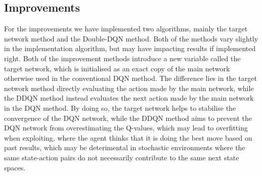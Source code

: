 \subsection{Improvements}
For the improvements we have implemented two algorithms, mainly the target network method and the Double-DQN method. Both of the methods vary slightly in the implementation algorithm, but may have impacting results if implemented right. Both of the improvement methods introduce a new variable called the target network, which is initialised as an exact copy of the main network otherwise used in the conventional DQN method. The difference lies in the target network method directly evaluating the action made by the main network, while the DDQN method instead evaluates the next action made by the main network in the DQN method. By doing so, the target network helps to stabilise the convergence of the DQN network, while the DDQN method aims to prevent the DQN network from overestimating the Q-values, which may lead to overfitting when exploiting, where the agent thinks that it is doing the best move based on past results, which may be deterimental in stochastic environments where the same state-action pairs do not necessarily contribute to the same next state spaces.
